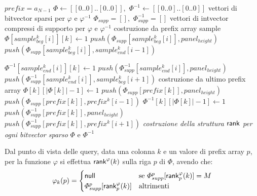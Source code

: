 \begin{algorithm}
  \footnotesize
  \begin{algorithmic}[1]
    \Comment  $prefix=a_{N-1}$ 
    \State $\varPhi\gets [[0..0]..[0..0]],\,\,\varPhi^{-1}\gets
    [[0..0]..[0..0]]$ 
    \Comment vettori di bitvector sparsi per $\varphi$ e $\varphi^{-1}$
    \State $\varPhi_{supp} = [],\,\,\varPhi_{supp}^{-1} = []$
    \Comment vettori di intvector compressi di supporto per $\varphi$ e
    $\varphi^{-1}$  
    \For {\textit{every} $k\in [0,|cols|)$}
    \Comment costruzione da prefix array sample
    \For {\textit{every} $i\in [0,|samples_{beg}|)$}
    \State $\varPhi[sample_{beg}^{k}[i]][k]\gets 1$
    \State $push(\varPhi_{supp}[sample_{beg}^{k}[i]], panel_{height})$
    \Else
    \State $push(\varPhi_{supp}[sample_{beg}^{k}[i]],sample_{end}^{k}[i-1])$
    \EndIf

    \State $\varPhi^{-1}[sample_{end}^{k}[i]][k]\gets 1$
    \State $push(\varPhi_{supp}^{-1}[sample_{end}^{k}[i]], panel_{height})$
    \Else
    \State $push(\varPhi_{supp}^{-1}[sample_{end}^{k}[i]],sample_{beg}^{k}[i+1])$
    \EndIf
    \EndFor
    \EndFor
    \For {\textit{every} $k\in [0,|prefix|)$}
    \Comment costruzione da ultimo prefix array
    \State $\varPhi[k][|\varPhi[k]|-1]\gets 1$
    \State $push(\varPhi_{supp}[prefix[k]], panel_{height})$
    \Else
    \State $push(\varPhi_{supp}[prefix[k]] ,prefix^k[i-1])$
    \EndIf
    \EndIf
    \State $\varPhi^{-1}[k][|\varPhi[k]|-1]\gets 1$
    \State $push(\varPhi^{-1}_{supp}[prefix[k]], panel_{height})$
    \Else
    \State $push(\varPhi^{-1}_{supp}[prefix[k]],prefix^k[i+1])$
    \EndIf
    \EndIf
    \EndFor
    \State \textit{costruzione della struttura $\mbox{\rm {\sf rank}}$ per ogni bitvector
    sparso} 
    $\varPhi$ e $\varPhi^{-1}$
    \EndFunction
  \end{algorithmic}
  \caption{Algoritmo per la costruzione della componente \texttt{PHI}.}
  \label{algo:phicos}
\end{algorithm}
Dal punto di vista delle query, data una colonna $k$ e un valore di
prefix array $p$, per la funzione $\varphi$ si effettua  $\mbox{\rm {\sf rank}}^\varphi(k)$
sulla riga $p$ di $\varPhi$, avendo che:
\[\varphi_k(p)=
  \begin{cases}
    \mbox{\rm {\sf null}}&\mbox{se }\varPhi_{supp}^p[\mbox{\rm {\sf rank}}^\varphi_p(k)]=M\\
    \varPhi_{supp}^p[\mbox{\rm {\sf rank}}^\varphi_p(k)]&\mbox{altrimenti }
  \end{cases}
\]

